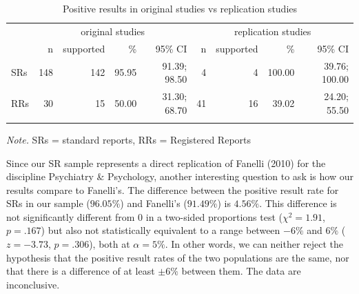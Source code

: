 \documentclass[british,,man,floatsintext]{apa6}
\begin{document}
\begin{table}[tbp]

\begin{center}
\begin{threeparttable}

\caption{\label{tab:unnamed-chunk-4}Positive results in original studies vs replication studies}

\begin{tabular}{lrrrrrrrr}
\toprule
 & \multicolumn{4}{c}{original studies} & \multicolumn{4}{c}{replication studies} \\
\cmidrule(r){2-5} \cmidrule(r){6-9}
 & n & supported & \% & 95\% CI & n & supported & \% & 95\% CI\\
\midrule
SRs & 148 & 142 & 95.95 & 91.39; 98.50 & 4 & 4 & 100.00 & 39.76; 100.00\\
RRs & 30 & 15 & 50.00 & 31.30; 68.70 & 41 & 16 & 39.02 & 24.20; 55.50\\
\bottomrule
\addlinespace
\end{tabular}

\begin{tablenotes}[para]
\normalsize{\textit{Note.} SRs = standard reports, RRs = Registered Reports}
\end{tablenotes}

\end{threeparttable}
\end{center}

\end{table}

Since our SR sample represents a direct replication of Fanelli (2010) for the discipline Psychiatry \& Psychology, another interesting question to ask is how our results compare to Fanelli's.
The difference between the positive result rate for SRs in our sample (\(96.05\%\)) and Fanelli's (\(91.49\%\)) is \(4.56\%\). This difference is not significantly different from 0 in a two-sided proportions test (\(\chi^2 = 1.91\), \(p= .167\)) but also not statistically equivalent to a range between \(-6\%\) and \(6\%\) (\(z = -3.73\), \(p= .306\)), both at \(\alpha = 5\%\).
In other words, we can neither reject the hypothesis that the positive result rates of the two populations are the same, nor that there is a difference of at least \(\pm 6\%\) between them.
The data are inconclusive.
\end{document}

